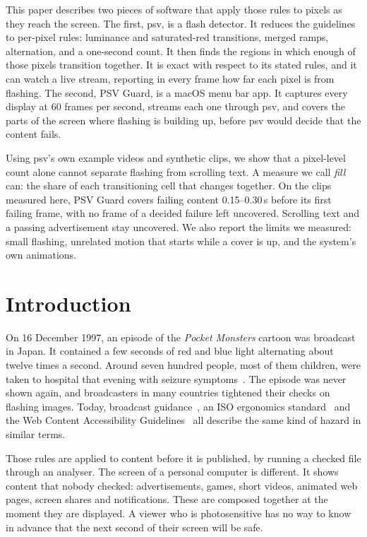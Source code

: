 \documentclass[11pt,a4paper]{article}
\newcommand{\psv}{\textsf{psv}}
\newcommand{\guard}{PSV Guard}
\begin{document}
This paper describes two pieces of software that apply those rules to pixels as they reach the screen. The first, \psv{}, is a flash detector. It reduces the guidelines to per-pixel rules: luminance and saturated-red transitions, merged ramps, alternation, and a one-second count. It then finds the regions in which enough of those pixels transition together. It is exact with respect to its stated rules, and it can watch a live stream, reporting in every frame how far each pixel is from flashing. The second, \guard{}, is a macOS menu bar app. It captures every display at 60 frames per second, streams each one through \psv{}, and covers the parts of the screen where flashing is building up, before \psv{} would decide that the content fails.

Using \psv{}'s own example videos and synthetic clips, we show that a pixel-level count alone cannot separate flashing from scrolling text. A measure we call \emph{fill} can: the share of each transitioning cell that changes together. On the clips measured here, \guard{} covers failing content 0.15--0.30\,s before its first failing frame, with no frame of a decided failure left uncovered. Scrolling text and a passing advertisement stay uncovered. We also report the limits we measured: small flashing, unrelated motion that starts while a cover is up, and the system's own animations.

\vspace{0.4cm}
\tableofcontents
\clearpage

\section{Introduction}

On 16 December 1997, an episode of the \emph{Pocket Monsters} cartoon was broadcast in Japan. It contained a few seconds of red and blue light alternating about twelve times a second. Around seven hundred people, most of them children, were taken to hospital that evening with seizure symptoms~\cite{takahashi1998}. The episode was never shown again, and broadcasters in many countries tightened their checks on flashing images. Today, broadcast guidance~\cite{itu1702,ofcom}, an ISO ergonomics standard~\cite{iso9241391} and the Web Content Accessibility Guidelines~\cite{wcag22} all describe the same kind of hazard in similar terms.

Those rules are applied to content before it is published, by running a checked file through an analyser. The screen of a personal computer is different. It shows content that nobody checked: advertisements, games, short videos, animated web pages, screen shares and notifications. These are composed together at the moment they are displayed. A viewer who is photosensitive has no way to know in advance that the next second of their screen will be safe.
\end{document}
